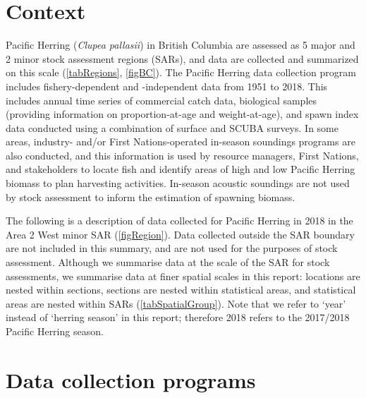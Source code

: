 \documentclass[12pt]{article}\usepackage[]{graphicx}\usepackage[]{color}
\newcommand{\regionName}{Area 2 West}
\newcommand{\regionType}{minor}
\newcommand{\firstYr}{1951}
\newcommand{\thisYr}{2018}
\newcommand{\fishName}{Pacific Herring}
\newcommand{\scienceName}{\emph{Clupea pallasii}}
\begin{document}
\frontmatter

\section{Context}


\fishName{} (\scienceName{}) in British Columbia are assessed as 5 major and 2 minor stock assessment regions (SARs), and data are collected and summarized on this scale (\autoref{tabRegions}, \autoref{figBC}).
The \fishName{} data collection program includes fishery-dependent and -independent data from \firstYr{} to \thisYr{}.
This includes annual time series of commercial catch data, biological samples (providing information on proportion-at-age and weight-at-age), and spawn index data conducted using a combination of surface and SCUBA surveys.
In some areas, industry- and/or First Nations-operated in-season soundings programs are also conducted, and this information is used by resource managers, First Nations, and stakeholders to locate fish and identify areas of high and low \fishName{} biomass to plan harvesting activities.
In-season acoustic soundings are not used by stock assessment to inform the estimation of spawning biomass.

The following is a description of data collected for \fishName{} in \thisYr{} in the \regionName{} \regionType{} SAR (\autoref{figRegion}).
Data collected outside the SAR boundary are not included in this summary, and are not used for the purposes of stock assessment.
Although we summarise data at the scale of the SAR for stock assessments, we summarise data at finer spatial scales in this report: locations are nested within sections, sections are nested within statistical areas, and statistical areas are nested within SARs (\autoref{tabSpatialGroup}).
\iftoggle{spatialGroup}{For the \regionName{} \regionType{} SAR, we use another level of spatial aggregation which we refer to as a `group'.}{\unskip}
Note that we refer to `year' instead of `herring season' in this report; therefore \thisYr{} refers to the 2017/2018 \fishName{} season.

\section{Data collection programs}
\end{document}
